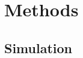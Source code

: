\documentclass[a4paper,fleqn,usenatbib]{mnras}
\begin{document}
% 

\section{Methods}
\label{sec:methods}

\subsection{Simulation}
\label{sec:methods:simulations}
\end{document}
